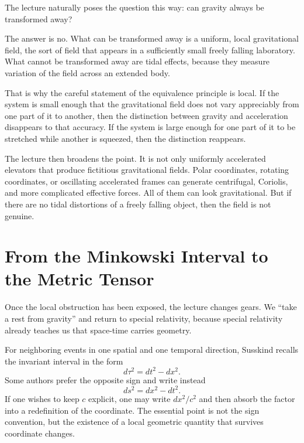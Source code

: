 The lecture naturally poses the question this way: can gravity always be transformed away?

The answer is no.  What can be transformed away is a uniform, local gravitational field, the sort of field that appears in a sufficiently small freely falling laboratory.  What cannot be transformed away are tidal effects, because they measure variation of the field across an extended body.

That is why the careful statement of the equivalence principle is local.  If the system is small enough that the gravitational field does not vary appreciably from one part of it to another, then the distinction between gravity and acceleration disappears to that accuracy.  If the system is large enough for one part of it to be stretched while another is squeezed, then the distinction reappears.

The lecture then broadens the point.  It is not only uniformly accelerated elevators that produce fictitious gravitational fields.  Polar coordinates, rotating coordinates, or oscillating accelerated frames can generate centrifugal, Coriolis, and more complicated effective forces.  All of them can look gravitational.  But if there are no tidal distortions of a freely falling object, then the field is not genuine.

\section{From the Minkowski Interval to the Metric Tensor}

Once the local obstruction has been exposed, the lecture changes gears.  We ``take a rest from gravity'' and return to special relativity, because special relativity already teaches us that space-time carries geometry.

For neighboring events in one spatial and one temporal direction, Susskind recalls the invariant interval in the form
\begin{equation}
d\tau^2 = dt^2 - dx^2.
\end{equation}
Some authors prefer the opposite sign and write instead
\begin{equation}
ds^2 = dx^2 - dt^2.
\end{equation}
If one wishes to keep \(c\) explicit, one may write \(dx^2/c^2\) and then absorb the factor into a redefinition of the coordinate.  The essential point is not the sign convention, but the existence of a local geometric quantity that survives coordinate changes.

